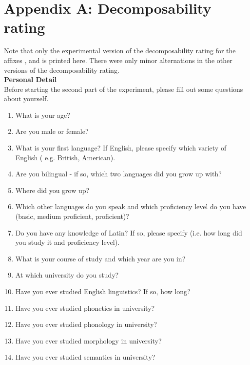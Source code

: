 
\appendix
\addappheadtotoc

\appendixpage

\section*{Appendix A: Decomposability rating} 

\label{Appendix A: Decomposability Rating}



Note that only the experimental version of the decomposability rating for the affixes ,  and  is printed here. There were only minor alternations in the other versions of the decomposability rating.\\


\noindent \textbf{Personal Detail}\\


\noindent  Before starting the second part of the experiment, please fill out some questions about yourself. \\
\begin{enumerate}

	\item What is your age?
	\item Are you male or female?
	\item What is your first language?  If English, please specify which variety of English ( e.g. British, American).	
	\item Are you bilingual - if so, which two languages did you grow up with?	
	\item Where did you grow up?
	\item Which other languages do you speak and which proficiency level do you have (basic, medium proficient, proficient)?
	\item Do you have any knowledge of Latin? If so, please specify (i.e. how long did you study it and proficiency level).
	\item What is your course of study and which year are you in?
	\item At which university do you study?
	\item Have you ever studied English linguistics? If so, how long?
	\item Have you ever studied phonetics in university?
	\item Have you ever studied phonology in university?
	\item Have you ever studied morphology in university?
	\item Have you ever studied semantics in university?
	
\end{enumerate}



